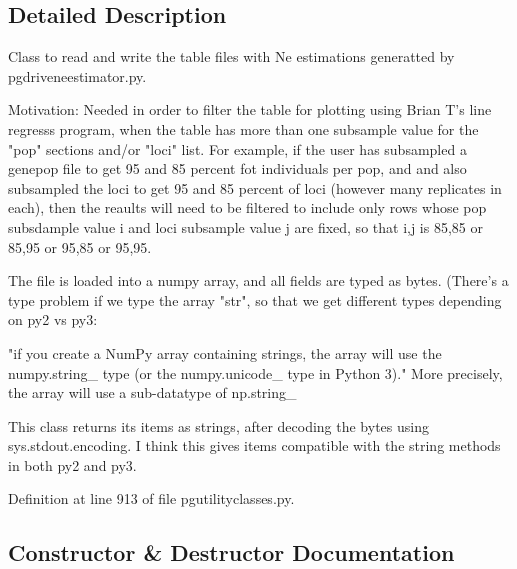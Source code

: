 \subsection{Detailed Description}
\begin{DoxyVerb}Class to read and write the table 
files with Ne estimations generatted 
by pgdriveneestimator.py.

Motivation: Needed in order to filter the
table for plotting using Brian T's
line regresss program, when the table
has more than one subsample value for 
the "pop" sections and/or "loci" list. For example,
if the user has subsampled a genepop file
to get 95 and 85 percent fot individuals
per pop, and and also subsampled the loci
to get 95 and 85 percent of loci (however
many replicates in each), then the reaults
will need to be filtered to include only
rows whose pop subsdample value i and loci 
subsample value j are fixed, so that i,j
is 85,85 or 85,95 or 95,85 or 95,95.

The file is loaded into a numpy array,
and all fields are typed as bytes.
(There's a type problem if we type the array 
"str", so that  we get different types depending 
on py2 vs py3:

"if you create a NumPy array containing strings, 
the array will use the numpy.string_ type (or 
the numpy.unicode_ type in Python 3)." More precisely, 
the array will use a sub-datatype of np.string_

This class returns its items as strings, after
decoding the bytes using sys.stdout.encoding.
I think this gives items compatible with 
the string methods in both py2 and py3.\end{DoxyVerb}
 

Definition at line 913 of file pgutilityclasses.\+py.



\subsection{Constructor \& Destructor Documentation}
